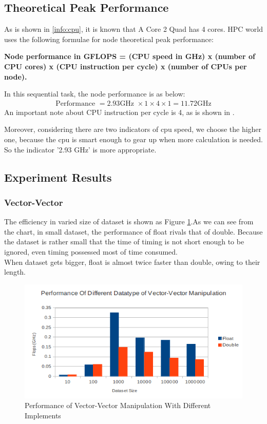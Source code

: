 \documentclass[a4paper]{article}   %
\begin{document}
\begin{CJK}{UTF8}{gbsn}
\begin{spacing}{1.2}
\subsection{Theoretical Peak Performance}
As is shown in \ref{info:cpu}, it is known that A Core 2 Quad has 4 cores. HPC world uses the following formulae for node theoretical peak performance:

\begin{center}
\bf
Node performance in GFLOPS = (CPU speed in GHz) x (number of CPU cores) x (CPU instruction per cycle) x (number of CPUs per node).\cite{plain:flops_formulae}
\end{center}

In this sequential task, the node performance is as below:
\begin{align}
\text {Performance }= 2.93 \text{GHz }\times 1 \times 4 \times 1 = 11.72 \text {GHz}
\end{align}
An important note about CPU instruction per cycle is 4, as is shown in \cite{plain:intel_manual}.

Moreover, considering there are two indicators of cpu speed, we choose the higher one, because the cpu is smart enough to gear up when more calculation is needed. So the indicator '2.93 GHz' is more appropriate.


\subsection{Experiment Results}

\subsubsection{Vector-Vector}
The efficiency in varied size of dataset is shown as Figure \ref{figs:flops_vv}.As we can see from the chart, in small dataset, the performance of float rivals that of double. Because the dataset is rather small that the time of timing is not short enough to be ignored, even timing possessed most of time consumed.\\

When dataset gets bigger, float is almost twice faster than double, owing to their length. 

\begin{figure}[htbp]
\centering
\includegraphics[width=12cm]{figs/vv.png}
\caption{Performance of Vector-Vector Manipulation With Different Implements}
\label{figs:flops_vv}
\end{figure}


\end{spacing}
\end{CJK}
\end{document}
